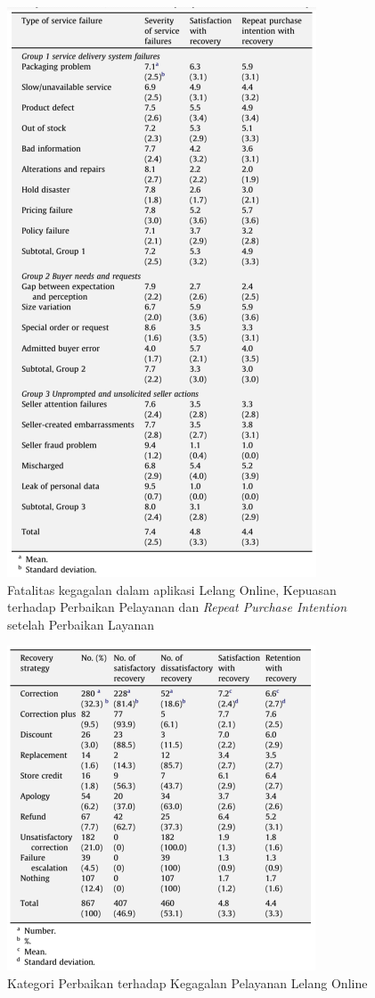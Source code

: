 	  \begin{figure}[H]
        \centering
        \includegraphics[height=\textheight]{images/bab3/Fatalitas-Kegagalan-Ecommerce.png}
        \caption{Fatalitas kegagalan dalam aplikasi Lelang Online, Kepuasan terhadap Perbaikan Pelayanan dan \textit{Repeat Purchase Intention} setelah Perbaikan Layanan}
        \label{severity-failures}
      \end{figure}
      
	  \begin{figure}[H]
        \centering
        \includegraphics[width=\linewidth]{images/bab3/Solusi-Perbaikan-Ketidakpuasan.png}
        \caption{Kategori Perbaikan terhadap Kegagalan Pelayanan Lelang Online}
        \label{service-recovery-strategies}
      \end{figure}
  
